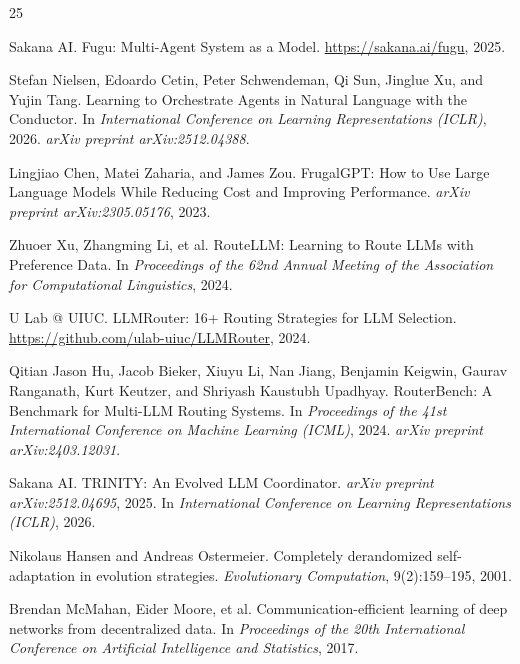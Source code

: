 \documentclass[11pt,a4paper]{article}
\begin{document}
\begin{thebibliography}{25}

Sakana AI.
\newblock Fugu: Multi-Agent System as a Model.
\newblock \url{https://sakana.ai/fugu}, 2025.

Stefan Nielsen, Edoardo Cetin, Peter Schwendeman, Qi Sun, Jinglue Xu, and Yujin Tang.
\newblock Learning to Orchestrate Agents in Natural Language with the Conductor.
\newblock In \emph{International Conference on Learning Representations (ICLR)}, 2026.
\newblock \emph{arXiv preprint arXiv:2512.04388}.

Lingjiao Chen, Matei Zaharia, and James Zou.
\newblock FrugalGPT: How to Use Large Language Models While Reducing Cost and Improving Performance.
\newblock \emph{arXiv preprint arXiv:2305.05176}, 2023.

Zhuoer Xu, Zhangming Li, et al.
\newblock RouteLLM: Learning to Route LLMs with Preference Data.
\newblock In \emph{Proceedings of the 62nd Annual Meeting of the Association for Computational Linguistics}, 2024.

U Lab @ UIUC.
\newblock LLMRouter: 16+ Routing Strategies for LLM Selection.
\newblock \url{https://github.com/ulab-uiuc/LLMRouter}, 2024.

Qitian Jason Hu, Jacob Bieker, Xiuyu Li, Nan Jiang, Benjamin Keigwin, Gaurav Ranganath, Kurt Keutzer, and Shriyash Kaustubh Upadhyay.
\newblock RouterBench: A Benchmark for Multi-LLM Routing Systems.
\newblock In \emph{Proceedings of the 41st International Conference on Machine Learning (ICML)}, 2024.
\newblock \emph{arXiv preprint arXiv:2403.12031}.

Sakana AI.
\newblock TRINITY: An Evolved LLM Coordinator.
\newblock \emph{arXiv preprint arXiv:2512.04695}, 2025.
\newblock In \emph{International Conference on Learning Representations (ICLR)}, 2026.

Nikolaus Hansen and Andreas Ostermeier.
\newblock Completely derandomized self-adaptation in evolution strategies.
\newblock \emph{Evolutionary Computation}, 9(2):159--195, 2001.

Brendan McMahan, Eider Moore, et al.
\newblock Communication-efficient learning of deep networks from decentralized data.
\newblock In \emph{Proceedings of the 20th International Conference on Artificial Intelligence and Statistics}, 2017.


\end{thebibliography}
\end{document}
